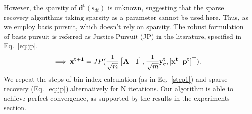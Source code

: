  However, the sparsity of $\mathbf{d^t}(s_{dt})$ is unknown, suggesting that the sparse recovery algorithms taking sparsity as a parameter cannot be used here. Thus, as we employ basis pursuit, which doesn't rely on sparsity. The robust formulation of basis pursuit is referred as Justice Pursuit (JP) \cite{Laska2009} in the literature, specified in Eq.~\ref{eq:jp}.
\begin{equation}
\implies \mathbf{{x^{t+1}}} = JP(\frac{1}{\sqrt{m}}\begin{bmatrix} \mathbf{A} & \mathbf{I} \end{bmatrix},\frac{1}{\sqrt{m}}\mathbf{y^t_c},[\mathbf{x^t~~p^t}]^\t).
\label{eq:jp}
\end{equation}
We repeat the steps of bin-index calculation (as in Eq.~\ref{step1}) and sparse recovery (Eq.~\ref{eq:jp}) alternatively for $\mathrm{N}$ iterations. Our algorithm is able to achieve perfect convergence, as supported by the results in the experiments section.



%
